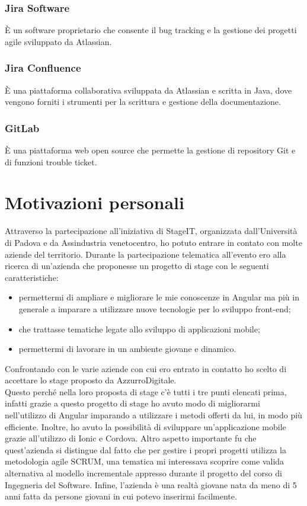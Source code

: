 \subsubsection{Jira Software}
È un software proprietario che consente il bug tracking e la gestione dei progetti agile sviluppato da Atlassian.

\subsubsection{Jira Confluence}
È una piattaforma collaborativa sviluppata da Atlassian e scritta in Java, dove vengono forniti i strumenti per la scrittura e gestione della documentazione.

\subsubsection{GitLab}
È una piattaforma web open source che permette la gestione di repository Git e di funzioni trouble ticket.

\section{Motivazioni personali}
Attraverso la partecipazione all'iniziativa di StageIT, organizzata dall'Università di Padova e da Assindustria venetocentro, ho potuto entrare in contato con molte aziende del territorio.
Durante la partecipazione telematica all'evento ero alla ricerca di un’azienda che proponesse un progetto di stage con le seguenti caratteristiche:

\begin{itemize}
	\item permettermi di ampliare e migliorare le mie conoscenze in Angular ma più in generale a imparare a utilizzare nuove tecnologie per lo sviluppo front-end;
	\item che trattasse tematiche legate allo sviluppo di applicazioni mobile;
	\item permettermi di lavorare in un ambiente giovane e dinamico.
	
\end{itemize}  

Confrontando con le varie aziende con cui ero entrato in contatto ho scelto di accettare lo stage proposto da AzzurroDigitale. \\
Questo perché nella loro proposta di stage c'è tutti i tre punti elencati prima, infatti grazie a questo progetto di stage ho avuto modo di migliorarmi nell’utilizzo di Angular imparando a utilizzare i metodi offerti da lui, in modo più efficiente. Inoltre, ho avuto la possibilità di sviluppare un’applicazione mobile grazie all'utilizzo di Ionic e Cordova. Altro aspetto importante fu che quest'azienda si distingue dal fatto che per gestire i propri progetti utilizza la metodologia agile \gls{SCRUM}, una tematica mi interessava scoprire come valida alternativa al modello incrementale appresso durante il progetto del corso di Ingegneria del Software. Infine, l'azienda è una realtà giovane nata da meno di 5 anni fatta da persone giovani in cui potevo inserirmi facilmente.\\
